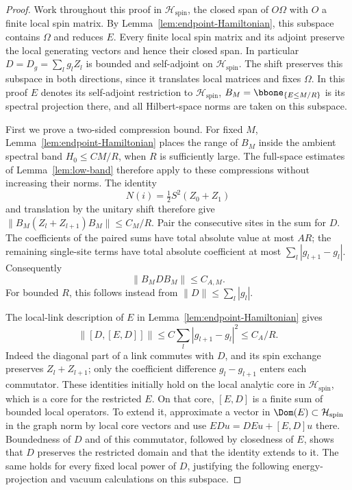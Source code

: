 \begin{proof}
Work throughout this proof in \(\mathcal H_{\mathrm{spin}}\), the closed
span of \(O\Omega\) with \(O\) a finite local spin matrix.
By Lemma~\ref{lem:endpoint-Hamiltonian}, this subspace contains
\(\Omega\) and reduces \(E\). Every finite local spin matrix and its
adjoint preserve the local generating vectors and hence their closed
span. In particular \(D=D_g=\sum_lg_lZ_l\) is bounded and self-adjoint
on \(\mathcal H_{\mathrm{spin}}\). The shift preserves this subspace
in both directions, since it translates local matrices and fixes
\(\Omega\). In this proof \(E\) denotes its self-adjoint restriction
to \(\mathcal H_{\mathrm{spin}}\),
\(B_M=\bbone_{\{E\le M/R\}}\) is its spectral projection there, and
all Hilbert-space norms are taken on this subspace.

First we prove a two-sided compression bound. For fixed \(M\),
Lemma~\ref{lem:endpoint-Hamiltonian} places the range of \(B_M\)
inside the ambient spectral band \(H_0\le C M/R\), when \(R\) is
sufficiently large. The full-space estimates of Lemma~\ref{lem:low-band}
therefore apply to these compressions without increasing their norms.
The identity
\[
 N(i)=\tfrac12S^2(Z_0+Z_1)
\]
and translation by the unitary shift therefore give
\(\|B_M(Z_l+Z_{l+1})B_M\|\le C_M/R\).
Pair the consecutive sites in the sum for \(D\). The coefficients of the
paired sums have total absolute value at most \(AR\); the remaining
single-site terms have total absolute coefficient at most
\(\sum_l|g_{l+1}-g_l|\). Consequently
\begin{equation}\label{eq:prob-two-sided}
 \|B_MDB_M\|\le C_{A,M}.
\end{equation}
For bounded \(R\), this follows instead from
\(\|D\|\le\sum_l|g_l|\).

The local-link description of \(E\) in
Lemma~\ref{lem:endpoint-Hamiltonian} gives
\begin{equation}\label{eq:prob-double-commutator}
 \|[D,[E,D]]\|\le C\sum_l|g_{l+1}-g_l|^2\le C_A/R.
\end{equation}
Indeed the diagonal part of a link commutes with \(D\), and its spin
exchange preserves \(Z_l+Z_{l+1}\); only the coefficient difference
\(g_l-g_{l+1}\) enters each commutator. These identities initially hold
on the local analytic core in \(\mathcal H_{\mathrm{spin}}\), which is
a core for the restricted \(E\). On that core, \([E,D]\) is a finite
sum of bounded local operators. To extend it, approximate a vector in
\(\Dom(E)\subset\mathcal H_{\mathrm{spin}}\) in the graph norm by local
core vectors and use \(EDu=DEu+[E,D]u\) there. Boundedness of \(D\)
and of this commutator, followed by closedness of \(E\), shows that
\(D\) preserves the restricted domain and that the identity extends to
it. The same holds for every fixed local power of \(D\), justifying
the following energy-projection and vacuum calculations on this subspace.


\end{proof}
